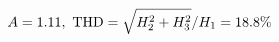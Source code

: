 \documentclass[preview]{standalone}
\begin{document}
\begin{align*}
\special{dvisvgm:raw <g id='unique000'>}A=1.11,\ \text{THD}=\sqrt{H_2^2+H_3^2}/H_1=18.8\%\special{dvisvgm:raw </g>}
\end{align*}
\end{document}
